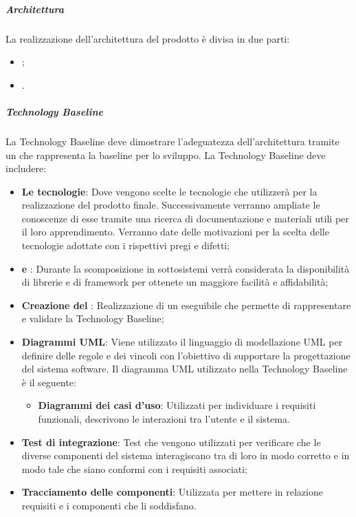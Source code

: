 \subparagraph*{Architettura}
La realizzazione dell’architettura del prodotto è divisa in due parti:
\begin{itemize}
	\item {};
	\item {}.
\end{itemize}

\subparagraph*{Technology Baseline}
La Technology Baseline deve dimostrare l’adeguatezza dell’architettura tramite un  che rappresenta la baseline per lo sviluppo. 
La Technology Baseline deve includere:
\begin{itemize}
	\item \textbf{Le tecnologie}: Dove vengono scelte le tecnologie che \Gruppo{} utilizzerà per la realizzazione del prodotto finale. Successivamente verranno ampliate le conoscenze di esse tramite una ricerca di documentazione e materiali utili per il loro apprendimento. Verranno date delle motivazioni per la scelta delle tecnologie adottate con i rispettivi pregi e difetti;
	\item \textbf{ e }: Durante la scomposizione in sottosistemi verrà considerata la disponibilità di librerie e di framework per ottenete un maggiore facilità e affidabilità;
	\item \textbf{Creazione del }: Realizzazione di un eseguibile che permette di rappresentare e validare la Technology Baseline;
	\item \textbf{Diagrammi UML}: Viene utilizzato il linguaggio di modellazione UML per definire delle regole e dei vincoli con l'obiettivo di supportare la progettazione del sistema software. Il diagramma UML utilizzato nella Technology Baseline è il seguente:
	\begin{itemize}
	\item \textbf{Diagrammi dei casi d'uso}: Utilizzati per individuare i requisiti funzionali, descrivono le interazioni tra l'utente e il sistema.
	\end{itemize}
	\item \textbf{Test di integrazione}: Test che vengono utilizzati per verificare che le diverse componenti del
	sistema interagiscano tra di loro in modo corretto e in modo tale che siano conformi con i requisiti associati;
	\item \textbf{Tracciamento delle componenti}: Utilizzata per mettere in relazione requisiti e i componenti che li soddisfano.
\end{itemize}

